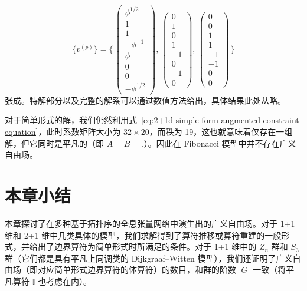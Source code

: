 \begin{equation}
  \{ v^{(p)} \} = \Biggl\{ \,
    \begin{pmatrix} \phi^{1/2} \\ 1 \\ 1 \\ -\phi^{-1} \\ \phi \\ 0 \\ 0 \\ -\phi^{1/2} \end{pmatrix}, \,
    \begin{pmatrix} 0 \\ 1 \\ 0 \\ 1 \\ -1 \\  0 \\ -1 \\ 0 \end{pmatrix}, \,
    \begin{pmatrix} 0 \\ 0 \\ 1 \\ 1 \\ -1 \\ -1 \\  0 \\ 0 \end{pmatrix} \,
  \Biggr\}
\end{equation}
张成。特解部分以及完整的解系可以通过数值方法给出，具体结果此处从略。

对于简单形式的解，我们仍然利用式~\eqref{eq:2+1d-simple-form-augmented-constraint-equation}，此时系数矩阵大小为 $32\times20$，而秩为 19，这也就意味着仅存在一组解，但它同时是平凡的（即 $A=B=\mathbb{I}$）。因此在 Fibonacci 模型中并不存在广义自由场。

\section{本章小结}

本章探讨了在多种基于拓扑序的全息张量网络中演生出的广义自由场。对于 1+1 维和 2+1 维中几类具体的模型，我们求解得到了算符推移或算符重建的一般形式，并给出了边界算符为简单形式时所满足的条件。对于 1+1 维中的 $Z_n$ 群和 $S_3$ 群（它们都是具有平凡上同调类的 Dijkgraaf--Witten 模型），我们还证明了广义自由场（即对应简单形式边界算符的体算符）的数目，和群的阶数 $|G|$ 一致（将平凡算符 $\mathbb{I}$ 也考虑在内）。
